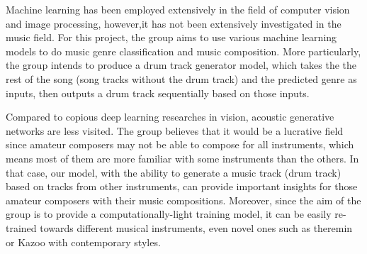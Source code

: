 \begin{par}
    \par \hspace{15pt} Machine learning has been employed extensively in the field of computer vision and image processing, however,it has not been extensively investigated in the music field. For this project, the group aims to use various machine learning models to do music genre classification and music composition. More particularly, the group intends to produce a drum track generator model, which takes the the rest of the song (song tracks without the drum track) and the predicted genre as inputs, then outputs a drum track sequentially based on those inputs.
\end{par}

\begin{par}
    \par \hspace{15pt} Compared to copious deep learning researches in vision, acoustic generative networks are less visited. The group believes that it would be a lucrative field since amateur composers may not be able to compose for all instruments, which means most of them are more familiar with some instruments than the others. In that case, our model, with the ability to generate a music track (drum track) based on tracks from other instruments, can provide important insights for those amateur composers with their music compositions. Moreover, since the aim of the group is to provide a computationally-light training model, it can be easily re-trained towards different musical instruments, even novel ones such as theremin or Kazoo with contemporary styles. 
\end{par}